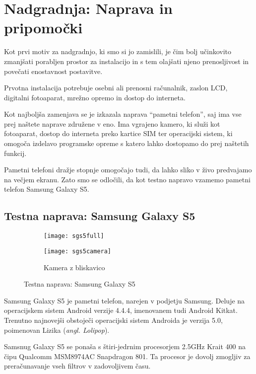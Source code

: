 \chapter{Nadgradnja: Naprava in pripomočki}
\label{ch:nadgradnjaNapravaPripomocki}
Kot prvi motiv za nadgradnjo, ki smo si jo zamislili, je čim bolj učinkovito zmanjšati
porabljen prostor za instalacijo in s tem olajšati njeno prenosljivost in
povečati enostavnost postavitve.

Prvotna instalacija potrebuje osebni ali prenosni računalnik, zaslon LCD,
digitalni fotoaparat, mrežno opremo in dostop do interneta.

Kot najboljša zamenjava se je izkazala naprava ``pametni telefon'', saj ima
vse prej naštete naprave združene v eno. Ima vgrajeno kamero, ki služi kot
fotoaparat, dostop do interneta preko kartice SIM ter operacijski sistem, ki
omogoča izdelavo programske opreme s katero lahko dostopamo do prej naštetih
funkcij.

Pametni telefoni dražje stopnje omogočajo tudi, da lahko sliko v živo
predvajamo na večjem ekranu. Zato smo se odločili, da kot testno napravo
vzamemo pametni telefon Samsung Galaxy S5.

\section{Testna naprava: Samsung Galaxy S5}
\label{sec:testnaNapravaSmartPhone}

\begin{figure}[!ht]
    \centering
    \begin{subfigure}[b]{0.4\textwidth}
        \texttt{[image: sgs5full]}
    \end{subfigure}
    \begin{subfigure}[b]{0.4\textwidth}
        \texttt{[image: sgs5camera]}
        \caption{Kamera z bliskavico}
    \end{subfigure}
    \caption{Testna naprava: Samsung Galaxy S5}
    \label{fig:sgs5}
\end{figure}

Samsung Galaxy S5 je pametni telefon, narejen v podjetju Samsung. Deluje na
operacijskem sistem Android verzije 4.4.4, imenovanem tudi Android Kitkat.
Trenutno najnovejši obstoječi operacijski sistem Androida je verzija 5.0,
poimenovan Lizika (\textit{angl. Lolipop}).

Samsnug Galaxy S5 se ponaša s štiri-jedrnim procesorjem 2.5GHz Krait 400 na
čipu Qualcomm MSM8974AC Snapdragon 801. Ta procesor je dovolj zmogljiv za
preračunavanje vseh filtrov v zadovoljivem času.

